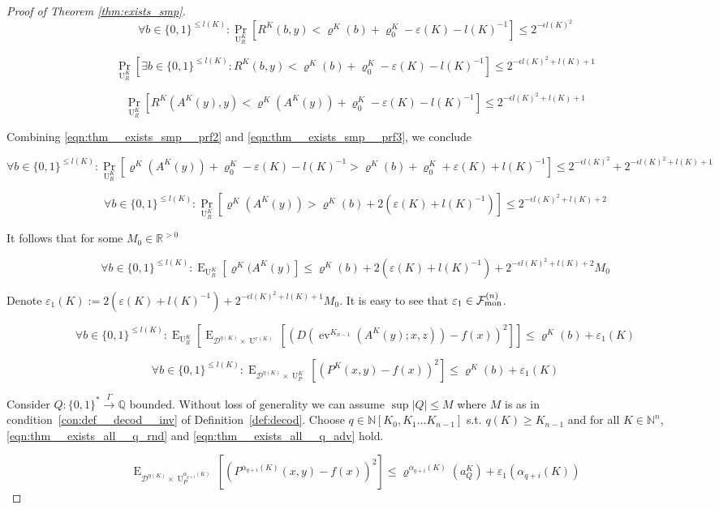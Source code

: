 \documentclass{article}
\numberwithin{equation}{section}
\theoremstyle{definition}
\theoremstyle{plain}
\newcommand{\Bool}{\{0,1\}}
\newcommand{\Words}{{\Bool^*}}
\DeclareMathOperator{\Prb}{Pr}
\DeclareMathOperator{\E}{E}
\DeclareMathOperator{\Ev}{ev}
\DeclareMathOperator{\Un}{U}
\newcommand{\Nats}{\mathbb{N}}
\newcommand{\Rats}{\mathbb{Q}}
\newcommand{\Reals}{\mathbb{R}}
\newcommand{\NatPoly}{\Nats[K_0, K_1 \ldots K_{n-1}]}
\newcommand{\Abs}[1]{\lvert #1 \rvert}
\newcommand{\Dist}{\mathcal{D}}
\newcommand{\Fall}{\mathcal{F}}
\newcommand{\FallM}{\Fall_{\textnormal{mon}}^{(n)}}
\newcommand{\Scheme}{\xrightarrow{\Gamma}}
\begin{document}
\begin{proof}[Proof of Theorem \ref{thm:exists_smp}]
\[\forall b \in \Bool^{\leq l(K)}: \Prb_{\Un_R^K}[R^K(b,y) < \varrho^K(b) + \varrho_0^K - \varepsilon(K) - l(K)^{-1}] \leq 2^{-\epsilon l(K)^2}\]

\[\Prb_{\Un_R^K}[\exists b \in \Bool^{\leq l(K)}: R^K(b,y) < \varrho^K(b) + \varrho_0^K - \varepsilon(K) - l(K)^{-1}] \leq 2^{-\epsilon l(K)^2+l(K)+1}\]

\begin{equation}
\label{eqn:thm__exists_smp__prf3}
\Prb_{\Un_R^K}[R^K(A^K(y),y) < \varrho^K(A^K(y)) + \varrho_0^K - \varepsilon(K) - l(K)^{-1}] \leq 2^{-\epsilon l(K)^2+l(K)+1}
\end{equation}

Combining \ref{eqn:thm__exists_smp__prf2} and \ref{eqn:thm__exists_smp__prf3}, we conclude

\[\forall b \in \Bool^{\leq l(K)}: \Prb_{\Un_R^K}[\varrho^K(A^K(y)) + \varrho_0^K - \varepsilon(K) - l(K)^{-1} > \varrho^K(b) + \varrho_0^K + \varepsilon(K) + l(K)^{-1}] \leq 2^{-\epsilon l(K)^2} + 2^{-\epsilon l(K)^2+l(K)+1}\]

\[\forall b \in \Bool^{\leq l(K)}: \Prb_{\Un_R^K}[\varrho^K(A^K(y)) > \varrho^K(b) + 2(\varepsilon(K) + l(K)^{-1})] \leq 2^{-\epsilon l(K)^2+l(K)+2}\]

It follows that for some ${M_0 \in \Reals^{>0}}$

\[\forall b \in \Bool^{\leq l(K)}: \E_{\Un_R^K}[\varrho^K(A^K(y)] \leq \varrho^K(b) + 2(\varepsilon(K) + l(K)^{-1}) + 2^{-\epsilon l(K)^2+l(K)+2} M_0\]

 Denote ${\varepsilon_1(K):=2(\varepsilon(K) + l(K)^{-1}) + 2^{-\epsilon l(K)^2+l(K)+1} M_0}$. It is easy to see that ${\varepsilon_1 \in \FallM}$.

\[\forall b \in \Bool^{\leq l(K)}: \E_{\Un_R^K}[\E_{\Dist^{\eta(K)} \times \Un^{r(K)}}[(D(\Ev^{K_{n-1}}(A^K(y);x,z))-f(x))^2]] \leq \varrho^K(b) + \varepsilon_1(K)\]

\[\forall b \in \Bool^{\leq l(K)}: \E_{\Dist^{\eta(K)} \times \Un_P^K}[(P^K(x,y)-f(x))^2] \leq \varrho^K(b) + \varepsilon_1(K)\]

Consider ${Q: \Words \Scheme \Rats}$ bounded. Without loss of generality we can assume ${\sup \Abs{Q} \leq M}$ where ${M}$ is as in condition~\ref{con:def__decod__inv} of Definition~\ref{def:decod}. Choose ${q \in \NatPoly}$ s.t. ${q(K) \geq K_{n-1}}$ and for all ${K \in \Nats^n}$, \ref{eqn:thm__exists_all__q_rnd} and \ref{eqn:thm__exists_all__q_adv} hold.

\[\E_{\Dist^{\eta(K)} \times \Un_P^{\alpha_{q+i}(K)}}[(P^{\alpha_{q+i}(K)}(x,y)-f(x))^2] \leq \varrho^{\alpha_{q+i}(K)}(a_Q^K) + \varepsilon_1(\alpha_{q+i}(K))\]


\end{proof}
\end{document}
